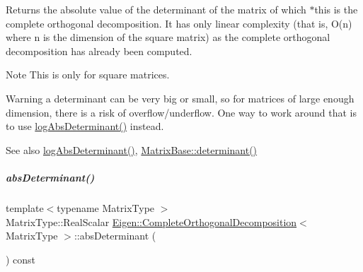 \begin{DoxyReturn}{Returns}
the absolute value of the determinant of the matrix of which $\ast$this is the complete orthogonal decomposition. It has only linear complexity (that is, O(n) where n is the dimension of the square matrix) as the complete orthogonal decomposition has already been computed.
\end{DoxyReturn}
\begin{DoxyNote}{Note}
This is only for square matrices.
\end{DoxyNote}
\begin{DoxyWarning}{Warning}
a determinant can be very big or small, so for matrices of large enough dimension, there is a risk of overflow/underflow. One way to work around that is to use \hyperlink{group___q_r___module_ad59d6dc78dab52a0038ac372b4a72c0d}{log\+Abs\+Determinant()} instead.
\end{DoxyWarning}
\begin{DoxySeeAlso}{See also}
\hyperlink{group___q_r___module_ad59d6dc78dab52a0038ac372b4a72c0d}{log\+Abs\+Determinant()}, \hyperlink{group___core___module_a7ad8f77004bb956b603bb43fd2e3c061}{Matrix\+Base\+::determinant()} 
\end{DoxySeeAlso}
\mbox{\label{group___q_r___module_ac040c34ce3fb2b68d3f57adc0c29d526}} 
\subparagraph{\texorpdfstring{abs\+Determinant()}{absDeterminant()}\hspace{0.1cm}{\footnotesize\ttfamily [2/2]}}
{\footnotesize\ttfamily template$<$typename Matrix\+Type $>$ \\
Matrix\+Type\+::\+Real\+Scalar \hyperlink{group___q_r___module_class_eigen_1_1_complete_orthogonal_decomposition}{Eigen\+::\+Complete\+Orthogonal\+Decomposition}$<$ Matrix\+Type $>$\+::abs\+Determinant (\begin{DoxyParamCaption}{ }\end{DoxyParamCaption}) const}

